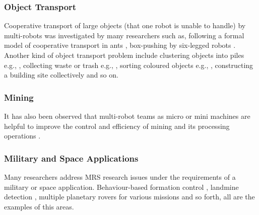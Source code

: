 \subsubsection*{Object Transport}
Cooperative transport of large objects (that one robot is unable to handle) by multi-robots was investigated by many researchers such as, following a formal model of cooperative transport in ants \cite{Kube+1993}, box-pushing by six-legged robots \cite{Mataric+1995}. Another kind of object transport problem include clustering objects into piles e.g., \cite{Beckers+1994}, collecting waste or trash e.g., \cite{Parker1994}, sorting coloured objects e.g., \cite{Melhuish+1998}, constructing a building site collectively \cite{Wawerla+2002} and so on. 
\subsubsection*{Mining} 
It has also been observed that multi-robot teams as micro or mini machines are helpful to improve the control and efficiency of mining and its processing operations \cite{Dunbar+2002}.
\subsubsection*{Military and Space Applications}
Many researchers address MRS research issues under the requirements of a military or space application. Behaviour-based formation control \cite{Balch+1998}, landmine detection \cite{Franklin+1995}, multiple planetary rovers for various missions \cite{Huntsberger2004} and so forth, all are the examples of this areas.
